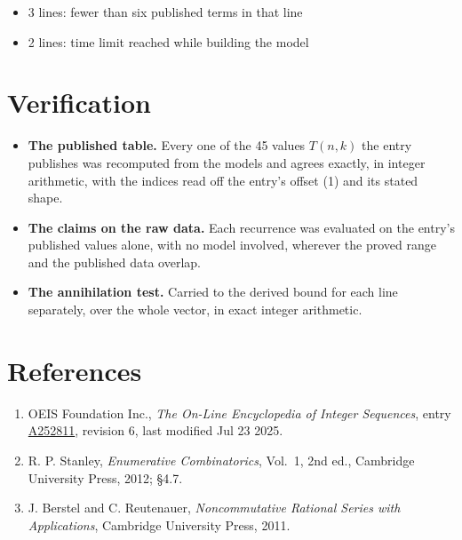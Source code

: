 \documentclass[11pt]{article}
\theoremstyle{definition}
\begin{document}
\begin{itemize}

\item 3 lines: fewer than six published terms in that line

\item 2 lines: time limit reached while building the model

\end{itemize}

\section{Verification}

\begin{itemize}

\item {\bfseries The published table.} Every one of the 45 values $T(n,k)$ the entry publishes was recomputed from the models and agrees exactly, in integer arithmetic, with the indices read off the entry's offset (1) and its stated shape.

\item {\bfseries The claims on the raw data.} Each recurrence was evaluated on the entry's published values alone, with no model involved, wherever the proved range and the published data overlap.

\item {\bfseries The annihilation test.} Carried to the derived bound for each line separately, over the whole vector, in exact integer arithmetic.

\end{itemize}

\section{References}

\begin{enumerate}

\item OEIS Foundation Inc., \emph{The On-Line Encyclopedia of Integer Sequences}, entry \href{https://oeis.org/A252811}{A252811}, revision 6, last modified Jul 23 2025.

\item R. P. Stanley, \emph{Enumerative Combinatorics}, Vol.~1, 2nd ed., Cambridge University Press, 2012; \S4.7.

\item J. Berstel and C. Reutenauer, \emph{Noncommutative Rational Series with Applications}, Cambridge University Press, 2011.

\end{enumerate}
\end{document}
